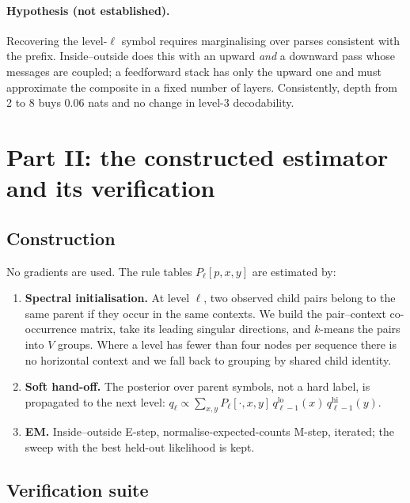\documentclass[11pt,a4paper]{article}
\theoremstyle{plain}
\theoremstyle{definition}
\begin{document}
\paragraph{Hypothesis (not established).}
Recovering the level-$\ell$ symbol requires marginalising over parses
consistent with the prefix. Inside--outside does this with an upward
\emph{and} a downward pass whose messages are coupled; a feedforward stack has
only the upward one and must approximate the composite in a fixed number of
layers. Consistently, depth from 2 to 8 buys $0.06$ nats and no change in
level-3 decodability.


\section{Part II: the constructed estimator and its verification}
\label{sec:hier-estimator}

\subsection{Construction}

No gradients are used. The rule tables $P_\ell[p,x,y]$ are estimated by:

\begin{enumerate}
\item \textbf{Spectral initialisation.} At level $\ell$, two observed child
pairs belong to the same parent if they occur in the same contexts. We build
the pair--context co-occurrence matrix, take its leading singular directions,
and $k$-means the pairs into $V$ groups. Where a level has fewer than four
nodes per sequence there is no horizontal context and we fall back to grouping
by shared child identity.

\item \textbf{Soft hand-off.} The posterior over parent symbols, not a hard
label, is propagated to the next level:
$q_\ell \propto \sum_{x,y} P_\ell[\cdot,x,y]\, q_{\ell-1}^{\mathrm{lo}}(x)\,
q_{\ell-1}^{\mathrm{hi}}(y)$.

\item \textbf{EM.} Inside--outside E-step, normalise-expected-counts M-step,
iterated; the sweep with the best held-out likelihood is kept.
\end{enumerate}

\subsection{Verification suite}
\end{document}
